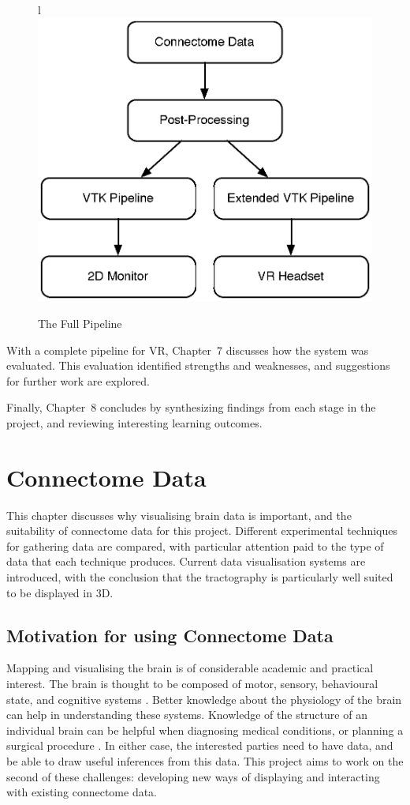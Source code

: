 \documentclass[MSc,paper=a4,pagesize=auto]{icldt}
\begin{document}
\begin{figure}[htbp!]l
    \centering
    \includegraphics[scale=0.5]{resources/data_pipeline_overview}
    \caption{The Full Pipeline}
    \label{fig:the_full_pipeline}
\end{figure}

With a complete pipeline for VR, Chapter~7 discusses how the system was evaluated. This evaluation identified strengths and weaknesses, and suggestions for further work are explored.

Finally, Chapter~8 concludes by synthesizing findings from each stage in the project, and reviewing interesting learning outcomes.

\chapter{Connectome Data}

This chapter discusses why visualising brain data is important, and the suitability of connectome data for this project. Different experimental techniques for gathering data are compared, with particular attention paid to the type of data that each technique produces. Current data visualisation systems are introduced, with the conclusion that the tractography is particularly well suited to be displayed in 3D. 

\section{Motivation for using Connectome Data}
Mapping and visualising the brain is of considerable academic and practical interest. The brain is thought to be composed of motor, sensory, behavioural state, and cognitive systems \cite{Swanson2003}. Better knowledge about the physiology of the brain can help in understanding these systems. Knowledge of the structure of an individual brain can be helpful when diagnosing medical conditions, or planning a surgical procedure \cite{Golby2011}. In either case, the interested parties need to have data, and be able to draw useful inferences from this data. This project aims to work on the second of these challenges: developing new ways of displaying and interacting with existing connectome data. 
\end{document}
